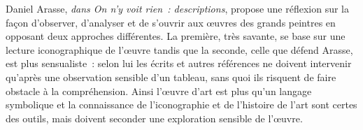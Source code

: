 \xspace
	Daniel Arasse, \emph{dans On n’y voit rien : descriptions}, propose une réflexion sur la façon d'observer, d'analyser et de s'ouvrir aux \oe{}uvres des grands peintres en opposant deux approches différentes. La première, très savante, se base sur une lecture iconographique de l’œuvre tandis que la seconde, celle que défend Arasse, est plus sensualiste : selon lui les écrits et autres références ne doivent intervenir qu'après une observation sensible d'un tableau, sans quoi ils risquent de faire obstacle à la compréhension. Ainsi l’\oe{}uvre d'art est plus qu'un langage symbolique et la connaissance de l’iconographie et de l’histoire de l’art sont certes des outils, mais doivent seconder une exploration sensible de l'\oe{}uvre.
